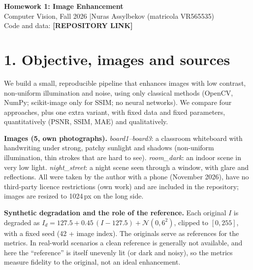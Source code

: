\documentclass[10pt,a4paper]{article}
\begin{document}
\begin{center}
{\Large\bfseries Homework 1: Image Enhancement}\\[2pt]
Computer Vision, Fall 2026 \quad|\quad Nuras Assylbekov (matricola VR565535)\\
Code and data: \textbf{[REPOSITORY LINK]}
\end{center}

\section*{1. Objective, images and sources}
We build a small, reproducible pipeline that enhances images with low contrast, non-uniform illumination and noise, using only classical methods (OpenCV, NumPy; scikit-image only for SSIM; no neural networks). We compare four approaches, plus one extra variant, with fixed data and fixed parameters, quantitatively (PSNR, SSIM, MAE) and qualitatively.

\textbf{Images (5, own photographs).} \emph{board1--board3}: a classroom whiteboard with handwriting under strong, patchy sunlight and shadows (non-uniform illumination, thin strokes that are hard to see). \emph{room\_dark}: an indoor scene in very low light. \emph{night\_street}: a night scene seen through a window, with glare and reflections. All were taken by the author with a phone (November 2026), have no third-party licence restrictions (own work) and are included in the repository; images are resized to 1024\,px on the long side.

\textbf{Synthetic degradation and the role of the reference.} Each original $I$ is degraded as $I_d = 127.5 + 0.45\,(I-127.5) + \mathcal N(0,6^2)$, clipped to $[0,255]$, with a fixed seed (42 + image index). The originals serve as references for the metrics. In real-world scenarios a clean reference is generally not available, and here the ``reference'' is itself unevenly lit (or dark and noisy), so the metrics measure fidelity to the original, not an ideal enhancement.
\end{document}

